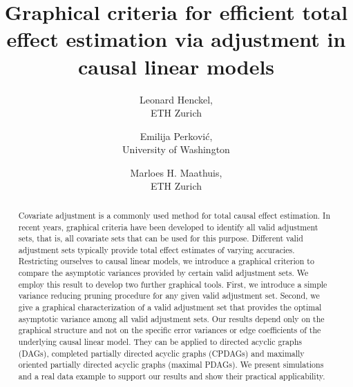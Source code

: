 \documentclass[11pt,a4paper]{article}
\theoremstyle{definition}
\theoremstyle{remark}
\begin{document}
	
		\title{Graphical criteria for efficient total effect estimation via adjustment in causal linear models}
	
	\author{Leonard Henckel, \\ ETH Zurich \\ 
		\and Emilija Perkovi\'c, \\ University of Washington \\
		\and Marloes H. Maathuis, \\ ETH Zurich \\}
	
	
	\maketitle	
	
\begin{abstract}
	Covariate adjustment is a commonly used method for total causal effect estimation. In recent years, graphical criteria have been developed to identify all valid adjustment sets, that is, all covariate sets that can be used for this purpose. Different valid adjustment sets typically provide total effect estimates of varying accuracies. Restricting ourselves to causal linear models, we introduce a graphical criterion to compare the asymptotic variances provided by certain valid adjustment sets. We employ this result to develop two further graphical tools. First, we introduce a simple variance reducing pruning procedure for any given valid adjustment set. Second, we give a graphical characterization of a valid adjustment set that provides the optimal asymptotic variance among all valid adjustment sets. Our results depend only on the graphical structure and not on the specific error variances or edge coefficients of the underlying causal linear model. They can be applied to directed acyclic graphs (DAGs), completed partially directed acyclic graphs (CPDAGs) and maximally oriented partially directed acyclic graphs (maximal PDAGs). We present simulations and a real data example to support our results and show their practical applicability.
\end{abstract}

 	
\end{document}
